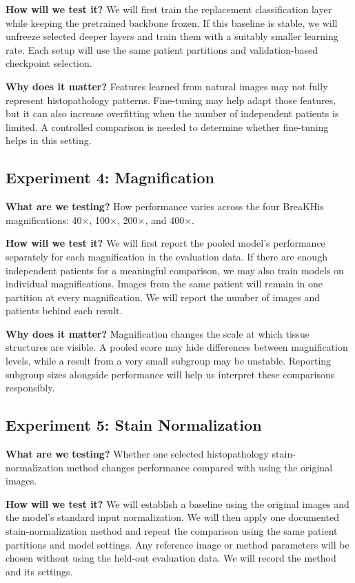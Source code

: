 \documentclass[11pt,a4paper]{article}
\begin{document}
\textbf{How will we test it?} We will first train the replacement classification layer while keeping the pretrained backbone frozen. If this baseline is stable, we will unfreeze selected deeper layers and train them with a suitably smaller learning rate. Each setup will use the same patient partitions and validation-based checkpoint selection.

\textbf{Why does it matter?} Features learned from natural images may not fully represent histopathology patterns. Fine-tuning may help adapt those features, but it can also increase overfitting when the number of independent patients is limited. A controlled comparison is needed to determine whether fine-tuning helps in this setting.

\subsection{Experiment 4: Magnification}

\textbf{What are we testing?} How performance varies across the four BreaKHis magnifications: 40$\times$, 100$\times$, 200$\times$, and 400$\times$.

\textbf{How will we test it?} We will first report the pooled model's performance separately for each magnification in the evaluation data. If there are enough independent patients for a meaningful comparison, we may also train models on individual magnifications. Images from the same patient will remain in one partition at every magnification. We will report the number of images and patients behind each result.

\textbf{Why does it matter?} Magnification changes the scale at which tissue structures are visible. A pooled score may hide differences between magnification levels, while a result from a very small subgroup may be unstable. Reporting subgroup sizes alongside performance will help us interpret these comparisons responsibly.

\subsection{Experiment 5: Stain Normalization}

\textbf{What are we testing?} Whether one selected histopathology stain-normalization method changes performance compared with using the original images.

\textbf{How will we test it?} We will establish a baseline using the original images and the model's standard input normalization. We will then apply one documented stain-normalization method and repeat the comparison using the same patient partitions and model settings. Any reference image or method parameters will be chosen without using the held-out evaluation data. We will record the method and its settings.
\end{document}
